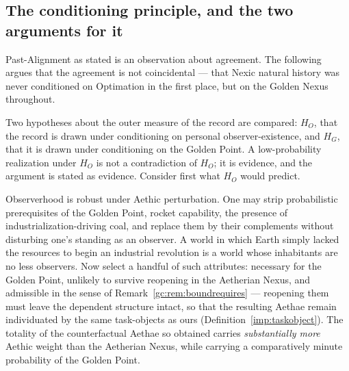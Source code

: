 \subsection{The conditioning principle, and the two arguments for it}\label{gc:sub:conditioning}

Past-Alignment as stated is an observation about agreement. The
following argues that the agreement is not coincidental --- that
Nexic natural history was never conditioned on Optimation in the first
place, but on the Golden Nexus throughout.

\begin{principle}
\label{gc:prin:conditioning}
Two hypotheses about the outer measure of the record are compared:
$H_O$, that the record is drawn under conditioning on personal
observer-existence, and $H_G$, that it is drawn under conditioning on
the Golden Point. A low-probability realization under $H_O$ is not a
contradiction of $H_O$; it is evidence, and the argument is stated as
evidence. Consider first what $H_O$ would predict.

Observerhood is robust under Aethic perturbation. One may strip
probabilistic prerequisites of the Golden Point, rocket capability,
the presence of industrialization-driving coal, and replace them by
their complements without disturbing one's standing as an observer. A
world in which Earth simply lacked the resources to begin an industrial
revolution is a world whose inhabitants are no less observers. Now select a handful of such attributes: necessary for the Golden Point,
unlikely to survive reopening in the Aetherian Nexus, and admissible in
the sense of Remark~\ref{gc:rem:boundrequires} --- reopening them must
leave the dependent structure intact, so that the resulting Aethae
remain individuated by the same task-objects as ours
(Definition~\ref{imp:taskobject}). The totality of
the counterfactual Aethae so obtained carries \emph{substantially more}
Aethic weight than the Aetherian Nexus, while carrying a comparatively
minute probability of the Golden Point.


\end{principle}
